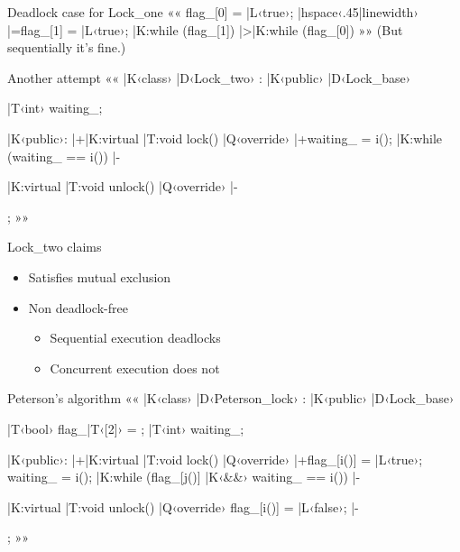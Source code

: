 \documentclass{beamer}
\begin{document}
\begin{frame}[fragile]{Deadlock case for Lock\_one}{}
  ««
  flag_[0] = |L‹true›;
  |hspace‹.45|linewidth› |=flag_[1] = |L‹true›;
  |K:while (flag_[1]) {}
                         |>|K:while (flag_[0]) {}
  »»
  \bigskip
(But sequentially it's fine.)
\end{frame}

\begin{frame}[fragile]{Another attempt}{}
  ««
  |K‹class› |D‹Lock_two› : |K‹public› |D‹Lock_base›
  {
  	|T‹int› waiting_;

  |K‹public›:
  	|+|K:virtual |T:void lock() |Q‹override›
    {
    	|+waiting_ = i();
      |K:while (waiting_ == i()) {} |-
    }

    |K:virtual |T:void unlock() |Q‹override› {} |-
  };
  »»
\end{frame}

\begin{frame}{Lock\_two claims}{}
  \begin{itemize}
    \item Satisfies mutual exclusion
    \item Non deadlock-free
      \begin{itemize}
        \item Sequential execution deadlocks
        \item Concurrent execution does not
      \end{itemize}
  \end{itemize}
\end{frame}

\begin{frame}[fragile]{Peterson's algorithm}{}
  ««
  |K‹class› |D‹Peterson_lock› : |K‹public› |D‹Lock_base›
  {
  	|T‹bool› flag_|T‹[2]› = {};
  	|T‹int› waiting_;

  |K‹public›:
  	|+|K:virtual |T:void lock() |Q‹override›
    {
    	|+flag_[i()] = |L‹true›;
      waiting_ = i();
      |K:while (flag_[j()] |K‹&&› waiting_ == i()) {} |-
    }

    |K:virtual |T:void unlock() |Q‹override›
    { flag_[i()] = |L‹false›; } |-
  };
  »»
\end{frame}
\end{document}
